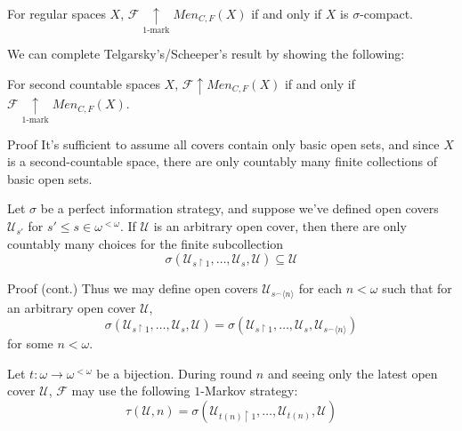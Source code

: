 \documentclass{beamer}
\theoremstyle{definition}
\newcommand{\win}{\uparrow}
\newcommand{\kmarkwin}[1]{\underset{#1\text{-mark}}{\uparrow}}
\newcommand{\mengame}[1]{Men_{C,F}(#1)}
\newcommand{\concat}{{^\frown}}
\newcommand{\rest}{\restriction}
\newcommand{\<}{\langle}
\renewcommand{\>}{\rangle}
\newcommand{\mc}[1]{\mathcal{#1}}
\newcommand{\pl}[1]{\mathscr{#1}}
\begin{document}
\begin{frame}
  \begin{corollary}
    For regular spaces $X$,
    $\pl F \kmarkwin{1}\mengame X$ if and only if $X$ is
    $\sigma$-compact.
  \end{corollary}

  \vpause

  We can complete Telgarsky's/Scheeper's result by showing the following:

  \begin{theorem}
    For second countable spaces $X$, $\pl F \win \mengame X$ if and only if
    $\pl F \kmarkwin{1}\mengame X$.
  \end{theorem}
\end{frame}

\begin{frame}{Proof}
  It's sufficient to assume all covers contain only basic open sets, and
  since $X$ is a second-countable space, there are only
  countably many finite collections of basic open sets.

  \vpause

  Let $\sigma$ be a perfect information strategy, and suppose we've defined
  open covers $\mc U_{s'}$ for $s'\leq s\in\omega^{<\omega}$. If $\mc U$ is an
  arbitrary open cover, then there are only countably many
  choices for the finite subcollection
  \[
    \sigma(\mc U_{s\rest 1},\dots,\mc U_{s},\mc U) \subseteq \mc U
  \]
\end{frame}

\begin{frame}{Proof (cont.)}
  Thus we may define open covers $\mc U_{s\concat\<n\>}$ for each
  $n<\omega$ such that for an arbitrary open cover $\mc U$,
  \[
    \sigma(\mc U_{s\rest 1},\dots,\mc U_{s},\mc U)
      =
    \sigma(\mc U_{s\rest 1},\dots,\mc U_{s},\mc U_{s\concat\<n\>})
  \]
  for some $n<\omega$.

  \vpause

  Let $t:\omega\to\omega^{<\omega}$ be a bijection. During round $n$ and
  seeing only the latest open cover $\mc U$, $\pl F$ may use the following
  $1$-Markov strategy:
  \[
    \tau(\mc U,n) = \sigma(\mc U_{t(n)\rest 1},\dots,\mc U_{t(n)},\mc U)
  \]
\end{frame}
\end{document}
